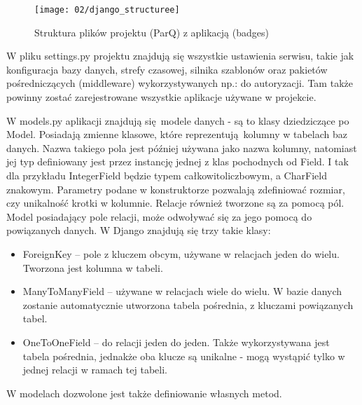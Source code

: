 \begin{figure}[h]
	\begin{center}
		\texttt{[image: 02/django\_structuree]}
	\end{center}
	\caption{Struktura plików projektu (ParQ) z aplikacją (badges)}
	\vspace{-0.3cm}
\end{figure}

W pliku settings.py projektu znajdują się wszystkie ustawienia serwisu, takie jak konfiguracja bazy danych, strefy czasowej, silnika szablonów oraz pakietów pośredniczących (middleware) wykorzystywanych np.: do autoryzacji. Tam także powinny zostać zarejestrowane wszystkie aplikacje używane w projekcie.

W models.py aplikacji znajdują się modele danych - są to klasy dziedziczące po Model. Posiadają zmienne klasowe, które reprezentują kolumny w tabelach baz danych. Nazwa takiego pola jest później używana jako nazwa kolumny, natomiast jej typ definiowany jest przez instancję jednej z klas pochodnych od Field. I tak dla przykładu IntegerField będzie typem całkowitoliczbowym, a CharField znakowym. Parametry podane w konstruktorze pozwalają zdefiniować rozmiar, czy unikalność krotki w kolumnie. Relacje również tworzone są za pomocą pól. Model posiadający pole relacji, może odwoływać się za jego pomocą do powiązanych danych. W Django znajdują się trzy takie klasy:

\begin{itemize}
	\item ForeignKey -- pole z kluczem obcym, używane w relacjach jeden do wielu. Tworzona jest kolumna w tabeli.
	\item ManyToManyField -- używane w relacjach wiele do wielu. W bazie danych zostanie automatycznie utworzona tabela pośrednia, z kluczami powiązanych tabel.
	\item OneToOneField -- do relacji jeden do jeden. Także wykorzystywana jest tabela pośrednia, jednakże oba klucze są unikalne - mogą wystąpić tylko w jednej relacji w ramach tej tabeli.
\end{itemize}

W modelach dozwolone jest także definiowanie własnych metod.

\begin{singlespace}
	\vspace{0.3cm}
	\inputminted[fontsize=\footnotesize]{python}{src/models.py}
\end{singlespace}

